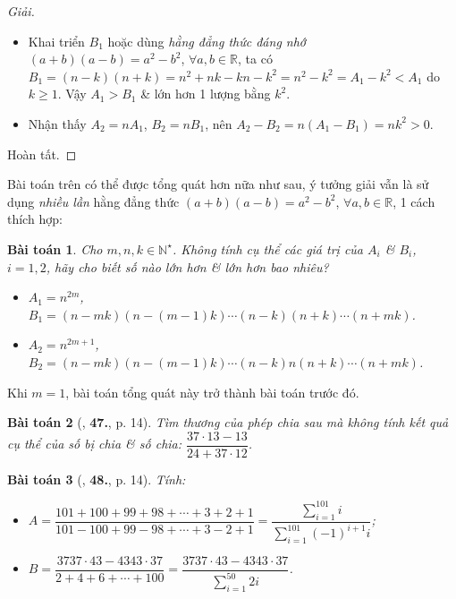 \documentclass{article}
\numberwithin{equation}{section}
\newtheorem{baitoan}{Bài toán}[section]
\begin{document}
\begin{proof}[Giải]
	\begin{itemize}
		\item[(a)] Khai triển $B_1$ hoặc dùng \textit{hằng đẳng thức đáng nhớ} $(a + b)(a - b) = a^2 - b^2$, $\forall a,b\in\mathbb{R}$, ta có $B_1 = (n - k)(n + k) = n^2 + nk - kn - k^2 = n^2 - k^2 = A_1 - k^2 < A_1$ do $k\ge 1$. Vậy $A_1 > B_1$ \& lớn hơn 1 lượng bằng $k^2$.
		\item[(b)] Nhận thấy $A_2 = nA_1$, $B_2 = nB_1$, nên $A_2 - B_2 = n(A_1 - B_1) = nk^2 > 0$.
	\end{itemize}
	Hoàn tất.
\end{proof}
Bài toán trên có thể được tổng quát hơn nữa như sau, ý tưởng giải vẫn là sử dụng \textit{nhiều lần} hằng đẳng thức $(a + b)(a - b) = a^2 - b^2$, $\forall a,b\in\mathbb{R}$, 1 cách thích hợp:

\begin{baitoan}
	Cho $m,n,k\in\mathbb{N}^\star$. Không tính cụ thể các giá trị của $A_i$ \& $B_i$, $i = 1,2$, hãy cho biết số nào lớn hơn \& lớn hơn bao nhiêu?
	\begin{itemize}
		\item[(a)] $A_1 = n^{2m}$, $B_1 = (n - mk)(n - (m - 1)k)\cdots(n - k)(n + k)\cdots(n + mk)$.
		\item[(b)] $A_2 = n^{2m + 1}$, $B_2 = (n - mk)(n - (m - 1)k)\cdots(n - k)n(n + k)\cdots(n + mk)$.
	\end{itemize}
\end{baitoan}
Khi $m = 1$, bài toán tổng quát này trở thành bài toán trước đó.

\begin{baitoan}[\cite{Binh_Toan_6_tap_1}, \textbf{47.}, p. 14]
	Tìm thương của phép chia sau mà không tính kết quả cụ thể của số bị chia \& số chia: $\dfrac{37\cdot 13 - 13}{24 + 37\cdot 12}$.
\end{baitoan}

\begin{baitoan}[\cite{Binh_Toan_6_tap_1}, \textbf{48.}, p. 14]
	Tính:
	\begin{itemize}
		\item[(a)] $A = \dfrac{101 + 100 + 99 + 98 + \cdots + 3 + 2 + 1}{101 - 100 + 99 - 98 + \cdots + 3 - 2 + 1} = \dfrac{\sum_{i=1}^{101} i}{\sum_{i=1}^{101} (-1)^{i+1}i}$;
		\item[(b)] $B = \dfrac{3737\cdot 43 - 4343\cdot 37}{2 + 4 + 6 + \cdots + 100} = \dfrac{3737\cdot 43 - 4343\cdot 37}{\sum_{i=1}^{50} 2i}$.
	\end{itemize}
\end{baitoan}
\end{document}
